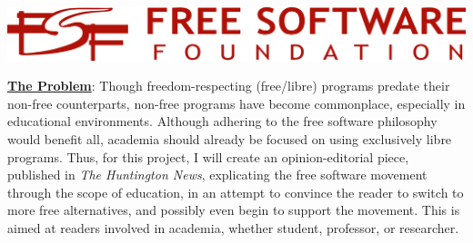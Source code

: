 \documentclass[12pt]{article}
\begin{document}
\begin{center}
  \includegraphics[width=.9\textwidth]{Images/FSFLogo.png}
\end{center}

\begin{tcolorbox}[colframe=red!65,colback=red!10]

  \underline{\textbf{The Problem}}: Though freedom-respecting (free/libre) programs predate their non-free counterparts, non-free programs have become commonplace, especially in educational environments. Although adhering to the free software philosophy would benefit all, academia should already be focused on using exclusively libre programs. Thus, for this project, I will create an opinion-editorial piece, published in \textit{The Huntington News}, explicating the free software movement through the scope of education, in an attempt to convince the reader to switch to more free alternatives, and possibly even begin to support the movement. This is aimed at readers involved in academia, whether student, professor, or researcher.

\end{tcolorbox}
\end{document}
